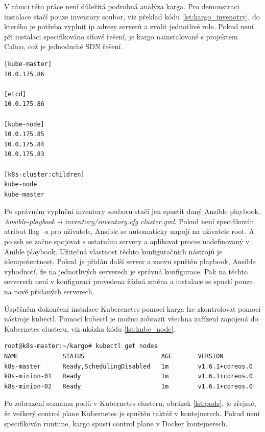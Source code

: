 V rámci této práce není důležitá podrobná analýza karga. Pro demonstraci instalace stačí pouze inventory soubor, viz překlad kódu \ref{lst:kargo_invenotry}, do kterého je potřeba vyplnit ip adresy serverů a zvolit jednotlivé role. Pokud není při instalaci specifikováno síťové řešení, je kargo nainstalované s projektem Calico, což je jednoduché SDN řešení.

\begin{lstlisting}[caption={Inventory soubor pro Kargo},label={lst:kargo_invenotry}]
[kube-master]
10.0.175.86

[etcd]
10.0.175.86

[kube-node]
10.0.175.85
10.0.175.84
10.0.175.83

[k8s-cluster:children]
kube-node
kube-master
\end{lstlisting}

Po správném vyplnění inventory souboru stačí jen spustit daný Ansible playbook. \textit{Ansible-playbook -i inventory/inventory.cfg cluster.yml}.
Pokud není specifikován atribut flag \textit{-u} pro uživatele, Ansible se automaticky napojí na uživatele root. A po ssh se začne spojovat s ostatními servery a aplikovat proces nadefinovaný v Anible playbook. Užitečná vlastnost těchto konfiguračních nástrojů je idempotentnost. Pokud je přidán další server a znovu spuštěn playbook,  Ansible vyhodnotí, že na jednotlivých serverech je správná konfigurace. Pak na těchto serverech není v konfiguraci provedena žádná změna a instalace se spustí pouze na nově přidaných serverech.


Úspěšném dokončení instalace Kuberenetes pomocí karga lze zkontrolovat pomocí nástroje kubectl. Pomocí kubectl je možno zobrazit všechna zařízení zapojená do Kubernetes clusteru, viz ukázka kódu \ref{lst:kube_node}.

\begin{lstlisting}[caption={Kubernetes seznam node},label= {lst:kube_node}]
root@k8s-master:~/kargo# kubectl get nodes
NAME            STATUS                     AGE       VERSION
k8s-master      Ready,SchedulingDisabled   1m        v1.6.1+coreos.0
k8s-minion-01   Ready                      1m        v1.6.1+coreos.0
k8s-minion-02   Ready                      1m        v1.6.1+coreos.0
\end{lstlisting}

Po zobrazení seznamu podů v Kubernetes clusteru, obrázek \ref{lst:pods}, je zřejmé, že veškerý control plane Kubernetes je spuštěn taktéž v kontejnerech. Pokud není specifikován runtime, kargo spustí control plane v Docker kontejnerech.

